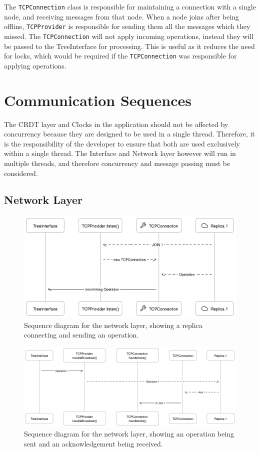 \documentclass[12pt]{report}
\begin{document}
The \texttt{TCPConnection} class is responsible for maintaining a connection with a single node, and receiving messages from that node. When a node joins after being offline, \texttt{TCPProvider} is responsible for sending them all the messages which they missed. The \texttt{TCPConnection} will not apply incoming operations, instead they will be passed to the TreeInterface for processing. This is useful as it reduces the need for locks, which would be required if the \texttt{TCPConnection} was responsible for applying operations. \par 

\section{Communication Sequences}
The CRDT layer and Clocks in the application should not be affected by concurrency because they are designed to be used in a single thread. Therefore, it is the responsibility of the developer to ensure that both are used exclusively within a single thread. The Interface and Network layer however will run in multiple threads, and therefore concurrency and message passing must be considered. \par

\subsection{Network Layer}

\begin{figure}[h]
    \centering
    \includegraphics[width=1\textwidth]{networkjoin.png}
    \caption{Sequence diagram for the network layer, showing a replica connecting and sending an operation.}
    \label{fig:networkjoin}
\end{figure} 

\begin{figure}[h]
    \centering
    \includegraphics[width=1\textwidth]{networksend.png}
    \caption{Sequence diagram for the network layer, showing an operation being sent and an acknowledgement being received.}
    \label{fig:networksend}
\end{figure} 
\end{document}

